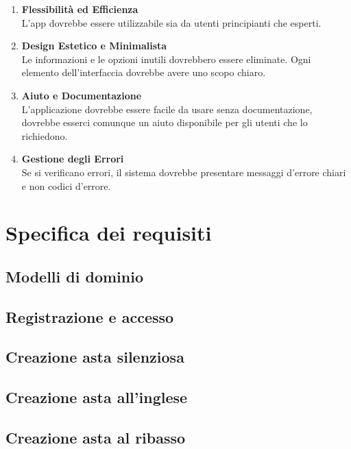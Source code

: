 \begin{enumerate}
	\item \textbf{\sffamily Flessibilità ed Efficienza} \\
	      L'app dovrebbe essere utilizzabile sia da utenti principianti che esperti.

	\item \textbf{\sffamily Design Estetico e Minimalista} \\
	      Le informazioni e le opzioni inutili dovrebbero essere eliminate.
	      Ogni elemento dell'interfaccia dovrebbe avere uno scopo chiaro.

	\item \textbf{\sffamily Aiuto e Documentazione} \\
	      L'applicazione dovrebbe essere facile da usare senza documentazione, dovrebbe esserci comunque un aiuto disponibile per gli utenti che lo richiedono.

	\item \textbf{\sffamily Gestione degli Errori} \\
	      Se si verificano errori, il sistema dovrebbe presentare messaggi d'errore chiari e non codici d'errore.
\end{enumerate}

\section{Specifica dei requisiti}
\subsection{Modelli di dominio}
\subsection*{Registrazione e accesso}


\newpage
\subsection*{Creazione asta silenziosa}


\newpage
\subsection*{Creazione asta all'inglese}


\newpage
\subsection*{Creazione asta al ribasso}


\newpage
